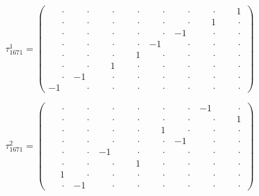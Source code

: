 \documentclass[
  10pt,
]{article}
\begin{document}
\[
\tau_{1671}^{1} = \left(\begin{array}{rrrr|rrrr}
\phantom{-}\cdot & \phantom{-}\cdot & \phantom{-}\cdot & \phantom{-}\cdot & \phantom{-}\cdot & \phantom{-}\cdot & \phantom{-}\cdot & \phantom{-}1 \\[-1.8pt]
\phantom{-}\cdot & \phantom{-}\cdot & \phantom{-}\cdot & \phantom{-}\cdot & \phantom{-}\cdot & \phantom{-}\cdot & \phantom{-}1 & \phantom{-}\cdot \\[-1.8pt]
\phantom{-}\cdot & \phantom{-}\cdot & \phantom{-}\cdot & \phantom{-}\cdot & \phantom{-}\cdot & -1 & \phantom{-}\cdot & \phantom{-}\cdot \\[-1.8pt]
\phantom{-}\cdot & \phantom{-}\cdot & \phantom{-}\cdot & \phantom{-}\cdot & -1 & \phantom{-}\cdot & \phantom{-}\cdot & \phantom{-}\cdot \\[-1.8pt]
\hline
\phantom{-}\cdot & \phantom{-}\cdot & \phantom{-}\cdot & \phantom{-}1 & \phantom{-}\cdot & \phantom{-}\cdot & \phantom{-}\cdot & \phantom{-}\cdot \\[-1.8pt]
\phantom{-}\cdot & \phantom{-}\cdot & \phantom{-}1 & \phantom{-}\cdot & \phantom{-}\cdot & \phantom{-}\cdot & \phantom{-}\cdot & \phantom{-}\cdot \\[-1.8pt]
\phantom{-}\cdot & -1 & \phantom{-}\cdot & \phantom{-}\cdot & \phantom{-}\cdot & \phantom{-}\cdot & \phantom{-}\cdot & \phantom{-}\cdot \\[-1.8pt]
-1 & \phantom{-}\cdot & \phantom{-}\cdot & \phantom{-}\cdot & \phantom{-}\cdot & \phantom{-}\cdot & \phantom{-}\cdot & \phantom{-}\cdot
\end{array}\right)
\]

\[
\tau_{1671}^{2} = \left(\begin{array}{rrrr|rrrr}
\phantom{-}\cdot & \phantom{-}\cdot & \phantom{-}\cdot & \phantom{-}\cdot & \phantom{-}\cdot & \phantom{-}\cdot & -1 & \phantom{-}\cdot \\[-1.8pt]
\phantom{-}\cdot & \phantom{-}\cdot & \phantom{-}\cdot & \phantom{-}\cdot & \phantom{-}\cdot & \phantom{-}\cdot & \phantom{-}\cdot & \phantom{-}1 \\[-1.8pt]
\phantom{-}\cdot & \phantom{-}\cdot & \phantom{-}\cdot & \phantom{-}\cdot & \phantom{-}1 & \phantom{-}\cdot & \phantom{-}\cdot & \phantom{-}\cdot \\[-1.8pt]
\phantom{-}\cdot & \phantom{-}\cdot & \phantom{-}\cdot & \phantom{-}\cdot & \phantom{-}\cdot & -1 & \phantom{-}\cdot & \phantom{-}\cdot \\[-1.8pt]
\hline
\phantom{-}\cdot & \phantom{-}\cdot & -1 & \phantom{-}\cdot & \phantom{-}\cdot & \phantom{-}\cdot & \phantom{-}\cdot & \phantom{-}\cdot \\[-1.8pt]
\phantom{-}\cdot & \phantom{-}\cdot & \phantom{-}\cdot & \phantom{-}1 & \phantom{-}\cdot & \phantom{-}\cdot & \phantom{-}\cdot & \phantom{-}\cdot \\[-1.8pt]
\phantom{-}1 & \phantom{-}\cdot & \phantom{-}\cdot & \phantom{-}\cdot & \phantom{-}\cdot & \phantom{-}\cdot & \phantom{-}\cdot & \phantom{-}\cdot \\[-1.8pt]
\phantom{-}\cdot & -1 & \phantom{-}\cdot & \phantom{-}\cdot & \phantom{-}\cdot & \phantom{-}\cdot & \phantom{-}\cdot & \phantom{-}\cdot
\end{array}\right)
\]
\end{document}
